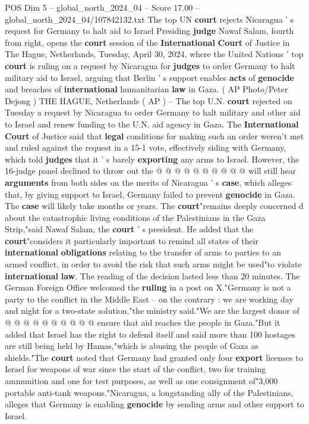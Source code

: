 \begin{textsample}{POS Dim 5 – global\_north\_2024\_04 – Score 17.00 – global\_north\_2024\_04/107842132.txt}  \label{ex:f5_pos_266}
The top UN \textbf{court} rejects Nicaragua ' s request for Germany to halt aid to Israel Presiding \textbf{judge} Nawaf Salam, fourth from right, opens the \textbf{court} session of the \textbf{International} \textbf{Court} of Justice in The Hague, Netherlands, Tuesday, April 30, 2024, where the United Nations ' top \textbf{court} is ruling on a request by Nicaragua for \textbf{judges} to order Germany to halt military aid to Israel, arguing that Berlin ' s support enables \textbf{acts} of \textbf{genocide} and breaches of \textbf{international} humanitarian \textbf{law} in Gaza. ( AP Photo/Peter Dejong ) THE HAGUE, Netherlands ( AP ) -- The top U.N. \textbf{court} rejected on Tuesday a request by Nicaragua to order Germany to halt military and other aid to Israel and renew funding to the U.N. aid agency in Gaza.
The \textbf{International} \textbf{Court} of Justice said that \textbf{legal} conditions for making such an order weren't met and ruled against the request in a 15-1 vote, effectively siding with Germany, which told \textbf{judges} that it ' s barely \textbf{exporting} any arms to Israel.
However, the 16-judge panel declined to throw out the @ @ @ @ @ @ @ @ @ @ will still hear \textbf{arguments} from both sides on the merits of Nicaragua ' s \textbf{case}, which alleges that, by giving support to Israel, Germany failed to prevent \textbf{genocide} in Gaza.
The \textbf{case} will likely take months or years.
The \textbf{court}"remains deeply concerned d about the catastrophic living conditions of the Palestinians in the Gaza Strip,"said Nawaf Salam, the \textbf{court} ' s president.
He added that the \textbf{court}"considers it particularly important to remind all states of their \textbf{international} \textbf{obligations} relating to the transfer of arms to parties to an armed conflict, in order to avoid the risk that such arms might be used"to violate \textbf{international} \textbf{law}.
The reading of the decision lasted less than 20 minutes.
The German Foreign Office welcomed the \textbf{ruling} in a post on X."Germany is not a party to the conflict in the Middle East -- on the contrary : we are working day and night for a two-state solution,"the ministry said."We are the largest donor of @ @ @ @ @ @ @ @ @ @ ensure that aid reaches the people in Gaza."But it added that Israel has the right to defend itself and said more than 100 hostages are still being held by Hamas,"which is abusing the people of Gaza as shields."The \textbf{court} noted that Germany had granted only four \textbf{export} licenses to Israel for weapons of war since the start of the conflict, two for training ammunition and one for test purposes, as well as one consignment of"3,000 portable anti-tank weapons."Nicaragua, a longstanding ally of the Palestinians, alleges that Germany is enabling \textbf{genocide} by sending arms and other support to Israel.

\end{textsample}
